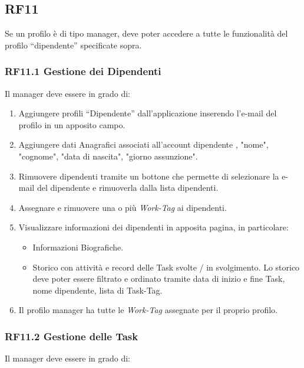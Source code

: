 \documentclass{report}
\begin{document}
\subsection*{RF11}
Se un profilo è di tipo manager, deve poter accedere a tutte le funzionalità del profilo “dipendente” specificate sopra.

\subsubsection*{RF11.1 Gestione dei Dipendenti}
Il manager deve essere in grado di:

\begin{enumerate}
	
	\item Aggiungere profili “Dipendente” dall’applicazione inserendo l’e-mail del profilo in un apposito campo.
	\item Aggiungere dati Anagrafici associati all'account dipendente , "nome", "cognome", "data di nascita", "giorno assunzione".
	\item Rimuovere dipendenti tramite un bottone che permette di selezionare la 
	e-mail del dipendente e rimuoverla dalla lista dipendenti.
	
	\item Assegnare e rimuovere una o più \textit{Work-Tag} ai dipendenti. 
	
	\item Visualizzare informazioni dei dipendenti in apposita pagina, in particolare:
	
	\begin{itemize}
		\item Informazioni Biografiche.
		\item Storico con attività e record delle Task svolte / in svolgimento. Lo storico deve poter essere filtrato e ordinato tramite data di inizio e fine Task, nome dipendente, lista di Task-Tag.
		
	\end{itemize}
	
	\item Il profilo manager ha tutte le \textit{Work-Tag} assegnate per il proprio profilo.
		
\end{enumerate}

\subsubsection{RF11.2 Gestione delle Task}
Il manager deve essere in grado di:
\end{document}
